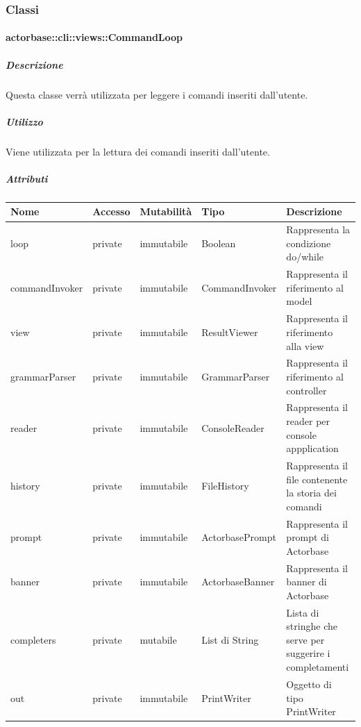 \documentclass{scalatekids-article}
\begin{document}
\subsubsection{Classi}

\paragraph{actorbase::cli::views::CommandLoop}
\label{sec:actorbase::cli::views::CommandLoop}

\subparagraph{Descrizione}

Questa classe verrà utilizzata per leggere i comandi inseriti dall'utente.

\subparagraph{Utilizzo}

Viene utilizzata per la lettura dei comandi inseriti dall'utente.

\subparagraph{Attributi}

\begin{tabular}{| l | l | l | l | l |}
  \hline
  Nome & Accesso & Mutabilità & Tipo & Descrizione\\
  \hline
  loop & private & immutabile & Boolean & Rappresenta la condizione do/while\\
  \hline
  commandInvoker & private & immutabile & CommandInvoker & Rappresenta il riferimento al model\\
  \hline
  view & private & immutabile & ResultViewer & Rappresenta il riferimento alla view\\
  \hline
  grammarParser & private & immutabile & GrammarParser & Rappresenta il riferimento al controller\\
  \hline
  reader & private & immutabile & ConsoleReader & Rappresenta il reader per console appplication \\
  \hline
  history & private & immutabile & FileHistory & Rappresenta il file contenente la storia dei comandi\\
  \hline
  prompt & private & immutabile & ActorbasePrompt & Rappresenta il prompt di Actorbase\\
  \hline
  banner & private & immutabile & ActorbaseBanner & Rappresenta il banner di Actorbase\\
  \hline
  completers & private & mutabile & List di String & Lista di stringhe che serve per suggerire i completamenti\\
  \hline
  out & private & immutabile & PrintWriter & Oggetto di tipo PrintWriter\\
  \hline
\end{tabular}
\end{document}
